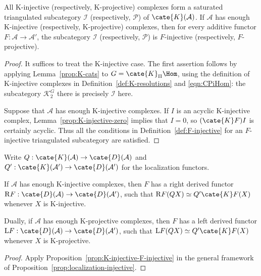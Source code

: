 \begin{proposition}\label{prop:K-injective-F-injective}
	All K-injective (respectively, K-projective) complexes form a saturated
	triangulated subcategory $\mathcal{I}$ (respectively, $\mathcal{P}$) of
	$\cate{K}(\mathcal{A})$. If $\mathcal{A}$ has enough K-injective
	(respectively, K-projective) complexes, then for every additive functor
	$F:\mathcal{A}\to\mathcal{A}'$, the subcategory $\mathcal{I}$
	(respectively, $\mathcal{P}$) is $F$-injective (respectively,
	$F$-projective).
\end{proposition}
\begin{proof}
	It suffices to treat the K-injective case. The first assertion follows by
	applying Lemma~\ref{prop:K-cats} to $G=\cate{K}_{\Pi}\Hom$, using the
	definition of K-injective complexes in
	Definition~\ref{def:K-resolutions} and \eqref{eqn:CPiHom}: the subcategory
	$\mathcal{K}_2^G$ there is precisely $\mathcal{I}$ here.

	Suppose that $\mathcal{A}$ has enough K-injective complexes. If $I$ is an
	acyclic K-injective complex, Lemma~\ref{prop:K-injective-zero} implies that
	$I=0$, so $(\cate{K}F)I$ is certainly acyclic. Thus all the conditions in
	Definition~\ref{def:F-injective} for an $F$-injective triangulated
	subcategory are satisfied.
\end{proof}

Write $Q:\cate{K}(\mathcal{A})\to\cate{D}(\mathcal{A})$ and
$Q':\cate{K}(\mathcal{A}')\to\cate{D}(\mathcal{A}')$ for the localization
functors.

\begin{corollary}
	If $\mathcal{A}$ has enough K-injective complexes, then $F$ has a right
	derived functor
	$\mathrm{R}F:\cate{D}(\mathcal{A})\to\cate{D}(\mathcal{A}')$, such that
	$\mathrm{R}F(QX)\simeq Q'\cate{K}F(X)$ whenever $X$ is K-injective.

	Dually, if $\mathcal{A}$ has enough K-projective complexes, then $F$ has a
	left derived functor
	$\mathrm{L}F:\cate{D}(\mathcal{A})\to\cate{D}(\mathcal{A}')$, such that
	$\mathrm{L}F(QX)\simeq Q'\cate{K}F(X)$ whenever $X$ is K-projective.
\end{corollary}
\begin{proof}
	Apply Proposition~\ref{prop:K-injective-F-injective} in the general
	framework of Proposition~\ref{prop:localization-injective}.
\end{proof}

